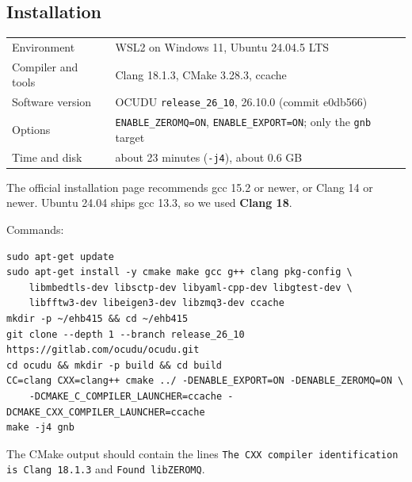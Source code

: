 \documentclass[10.5pt,a4paper]{article}
\newenvironment{codebox}{\par\noindent\begin{minipage}{\textwidth}}{\end{minipage}\par}
\begin{document}
\subsection{Installation}
\begin{center}\sffamily\small
\begin{tabular}{@{}ll@{}}
\toprule
Environment & WSL2 on Windows 11, Ubuntu 24.04.5 LTS \\
Compiler and tools & Clang 18.1.3, CMake 3.28.3, ccache \\
Software version & OCUDU \texttt{release\_26\_10}, 26.10.0 (commit e0db566) \\
Options & \texttt{ENABLE\_ZEROMQ=ON}, \texttt{ENABLE\_EXPORT=ON}; only the \texttt{gnb} target \\
Time and disk & about 23 minutes (\texttt{-j4}), about 0.6 GB \\
\bottomrule
\end{tabular}
\end{center}
The official installation page recommends gcc 15.2 or newer, or Clang 14 or newer. Ubuntu 24.04 ships gcc 13.3, so we used \textbf{Clang 18}.\begin{codebox}Commands:\par
\begin{lstlisting}
sudo apt-get update
sudo apt-get install -y cmake make gcc g++ clang pkg-config \
    libmbedtls-dev libsctp-dev libyaml-cpp-dev libgtest-dev \
    libfftw3-dev libeigen3-dev libzmq3-dev ccache
mkdir -p ~/ehb415 && cd ~/ehb415
git clone --depth 1 --branch release_26_10 https://gitlab.com/ocudu/ocudu.git
cd ocudu && mkdir -p build && cd build
CC=clang CXX=clang++ cmake ../ -DENABLE_EXPORT=ON -DENABLE_ZEROMQ=ON \
    -DCMAKE_C_COMPILER_LAUNCHER=ccache -DCMAKE_CXX_COMPILER_LAUNCHER=ccache
make -j4 gnb
\end{lstlisting}
\end{codebox}
The CMake output should contain the lines \texttt{The CXX compiler identification is Clang 18.1.3} and \texttt{Found libZEROMQ}.
\end{document}
